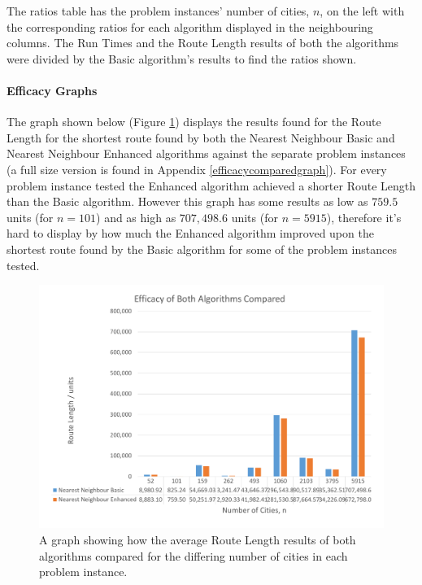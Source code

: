\documentclass[conference,backref=page]{acmsiggraph}
\begin{document}
The ratios table has the problem instances' number of cities, $n$, on the left with the corresponding ratios for each algorithm displayed in the neighbouring columns. The Run Times and the Route Length results of both the algorithms were divided by the Basic algorithm's results to find the ratios shown.


\paragraph{Efficacy Graphs}
The graph shown below (Figure \ref{efficacycomparedcolumngraph}) displays the results found for the Route Length for the shortest route found by both the Nearest Neighbour Basic and Nearest Neighbour Enhanced algorithms against the separate problem instances (a full size version is found in Appendix \ref{efficacycomparedgraph}). For every problem instance tested the Enhanced algorithm achieved a shorter Route Length than the Basic algorithm. However this graph has some results as low as $759.5$ units (for $n = 101$) and as high as $707,498.6$ units (for $n = 5915$), therefore it's hard to display by how much the Enhanced algorithm improved upon the shortest route found by the Basic algorithm for some of the problem instances tested.

\begin{figure}[h]
	\includegraphics[width=\columnwidth]{images/efficacy_compared_column.pdf}
	\caption{A graph showing how the average Route Length results of both algorithms compared for the differing number of cities in each problem instance.}
	\label{efficacycomparedcolumngraph}
\end{figure}
\end{document}
